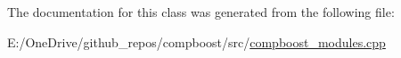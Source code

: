 The documentation for this class was generated from the following file\+:\begin{DoxyCompactItemize}
\item 
E\+:/\+One\+Drive/github\+\_\+repos/compboost/src/\mbox{\hyperlink{compboost__modules_8cpp}{compboost\+\_\+modules.\+cpp}}\end{DoxyCompactItemize}
